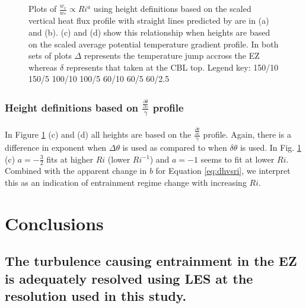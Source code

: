 \begin{figure}[htbp]
\begin{minipage}[b]{0.5\linewidth}
        \end{minipage}
        \caption{Plots of $\frac{w_{e}}{w_{*}} \propto Ri^{a}$ using height definitions based on the scaled vertical heat flux profile with straight lines predicted by \cite{GarciaMellado} are in (a) and (b).  (c) and (d) show this relationship when heights are based on the scaled average potential temperature gradient profile. In both sets of plots $\Delta$ represents the temperature jump accross the EZ whereas $\delta$ represents that taken at the CBL top. Legend key:{\color{red} } 150/10  150/5 \hspace{2mm} {\color{black} } 100/10 \hspace{2mm} {\color{black} } 100/5 \hspace{2mm} {\color{offyellow} } 60/10 \hspace{2mm} {\color{offyellow} } 60/5 \hspace{2mm} {\color{offyellow} } 60/2.5}
        \label{fig:weinvri}
\end{figure}


\subsubsection{Height definitions based on $\frac{\frac{\partial \overline{\theta}}{\partial z}}{\gamma}$ profile}
In Figure \ref{fig:weinvri} (c) and (d) all heights are based on the $\frac{\frac{\partial \overline{\theta}}{\partial z}}{\gamma}$ profile.  Again, there is a difference in exponent when $\Delta \theta$ is used as compared to when $\delta \theta$ is used.  In Fig. \ref{fig:weinvri} (c) $a=-\frac{3}{2}$ fits at higher $Ri$ (lower $Ri^{-1}$) and $a=-1$ seems to fit at lower $Ri$.  Combined with the apparent change in $b$ for Equation \ref{eq:dhvsri}, we interpret this as an indication of entrainment regime change with increasing $Ri$.\\ 


\section{Conclusions}
\subsection{The turbulence causing entrainment in the EZ is adequately resolved using LES at the resolution used in this study.}

